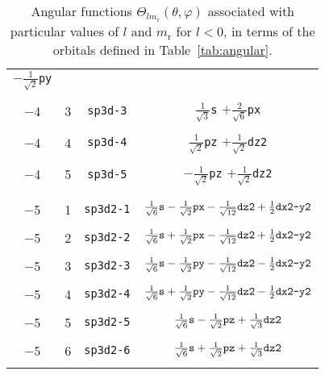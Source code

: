 \begin{table}
\begin{center}
\begin{tabular}{|cccc|}
$-\frac{1}{\sqrt{2}}$\verb#py#\\
&&&\\
 $-$4  &  3  &  \verb#sp3d-3#  &
$\frac{1}{\sqrt{3}}$\verb#s# $+\frac{2}{\sqrt{6}}$\verb#px#\\
&&&\\
 $-$4  &  4  &  \verb#sp3d-4#  &
$\frac{1}{\sqrt{2}}$\verb#pz# $+\frac{1}{\sqrt{2}}$\verb#dz2#\\
&&&\\
 $-$4  &  5  &  \verb#sp3d-5#  &
$-\frac{1}{\sqrt{2}}$\verb#pz# $+\frac{1}{\sqrt{2}}$\verb#dz2#\\
&&&\\\hline&&&\\
 $-$5  &  1  &  \verb#sp3d2-1# &
$\frac{1}{\sqrt{6}}\verb#s#-\frac{1}{\sqrt{2}}\verb#px#
-\frac{1}{\sqrt{12}}\verb#dz2#+\frac{1}{2}\verb#dx2-y2#$ \\
&&&\\
 $-$5  &  2  &  \verb#sp3d2-2# &
$\frac{1}{\sqrt{6}}\verb#s#+\frac{1}{\sqrt{2}}\verb#px#
-\frac{1}{\sqrt{12}}\verb#dz2#+\frac{1}{2}\verb#dx2-y2#$ \\
&&&\\
 $-$5  &  3  &  \verb#sp3d2-3# &
$\frac{1}{\sqrt{6}}\verb#s#-\frac{1}{\sqrt{2}}\verb#py#
-\frac{1}{\sqrt{12}}\verb#dz2#-\frac{1}{2}\verb#dx2-y2#$ \\
&&&\\
 $-$5  &  4  &  \verb#sp3d2-4# &
$\frac{1}{\sqrt{6}}\verb#s#+\frac{1}{\sqrt{2}}\verb#py#
-\frac{1}{\sqrt{12}}\verb#dz2#-\frac{1}{2}\verb#dx2-y2#$ \\
&&&\\
 $-$5  &  5  &  \verb#sp3d2-5# &
$\frac{1}{\sqrt{6}}\verb#s#-\frac{1}{\sqrt{2}}\verb#pz#
+\frac{1}{\sqrt{3}}\verb#dz2#$ \\
&&&\\
 $-$5  &  6  &  \verb#sp3d2-6# &
$\frac{1}{\sqrt{6}}\verb#s#+\frac{1}{\sqrt{2}}\verb#pz#
+\frac{1}{\sqrt{3}}\verb#dz2#$ \\
&&&\\\hline\hline
\end{tabular}
\caption{Angular functions
$\Theta_{lm_{\mathrm{r}}}(\theta,\varphi)$
associated with particular values of $l$ and $m_{\mathrm{r}}$ for
$l<0$, in terms of the orbitals defined in Table~\ref{tab:angular}.
\label{tab:hybrids}}
\end{center}
\end{table}



